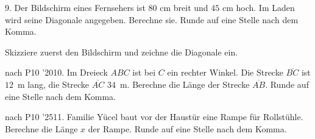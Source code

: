 \documentclass[11pt]{article}
\begin{document}
\begin{pfaufg}{}{9.}{}
Der Bildschirm eines Fernsehers ist $80$ cm breit und $45$ cm hoch. Im Laden wird seine Diagonale angegeben. Berechne sie. Runde auf eine Stelle nach dem Komma.\par
Skizziere zuerst den Bildschirm und zeichne die Diagonale ein.\par
{}
\end{pfaufg}

\begin{pfaufg}{nach P10 ’20}{10.}{}
Im Dreieck $ABC$ ist bei $C$ ein rechter Winkel. Die Strecke $\overline{BC}$ ist $12$~m lang, die Strecke $\overline{AC}$ $34$~m. Berechne die Länge der Strecke $\overline{AB}$. Runde auf eine Stelle nach dem Komma.
\end{pfaufg}

\begin{pfaufg}{nach P10 ’25}{11.}{}
Familie Yücel baut vor der Haustür eine Rampe für Rollstühle. Berechne die Länge $x$ der Rampe. Runde auf eine Stelle nach dem Komma.
\end{pfaufg}

\end{document}
